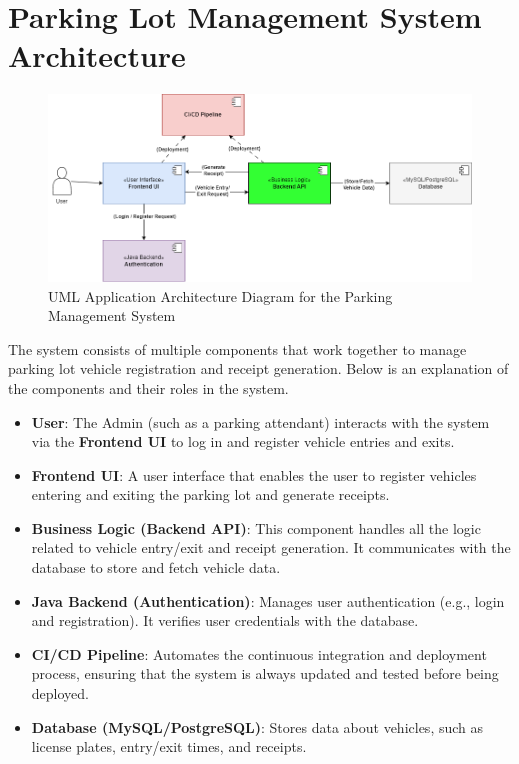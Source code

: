 \section{Parking Lot Management System Architecture}

\begin{figure}[h!]
    \centering
    \includegraphics[width=1\textwidth]{architecture-diagram/Parking_Management_System_Architecture.png}
    \caption{UML Application Architecture Diagram for the Parking Management System}
    \label{uml}
\end{figure}

The system consists of multiple components that work together to manage parking lot vehicle registration and receipt generation. Below is an explanation of the components and their roles in the system.

\begin{itemize}
    \item \textbf{User}: The Admin (such as a parking attendant) interacts with the system via the \textbf{Frontend UI} to log in and register vehicle entries and exits.
    \item \textbf{Frontend UI}: A user interface that enables the user to register vehicles entering and exiting the parking lot and generate receipts.
    \item \textbf{Business Logic (Backend API)}: This component handles all the logic related to vehicle entry/exit and receipt generation. It communicates with the database to store and fetch vehicle data.
    \item \textbf{Java Backend (Authentication)}: Manages user authentication (e.g., login and registration). It verifies user credentials with the database.
    \item \textbf{CI/CD Pipeline}: Automates the continuous integration and deployment process, ensuring that the system is always updated and tested before being deployed.
    \item \textbf{Database (MySQL/PostgreSQL)}: Stores data about vehicles, such as license plates, entry/exit times, and receipts.
\end{itemize}

